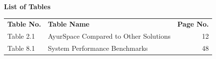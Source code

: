 \documentclass[12pt]{article}
\begin{document}
\thispagestyle{fancy}
\begin{center}
    \textbf{\LARGE List of Tables}
\end{center}

\vspace{1cm}

\begin{tabular}{ l l r }
\textbf{Table No.} & \textbf{Table Name} & \textbf{Page No.} \\[0.5cm]

Table 2.1 & AyurSpace Compared to Other Solutions & 12 \\
Table 8.1 & System Performance Benchmarks         & 48 \\

\end{tabular}
\end{document}
